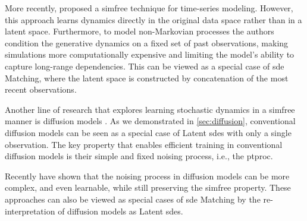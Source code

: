 More recently, \citet{zhang2024trajectory} proposed a \gls{simfree} technique for time-series modeling. However, this approach learns dynamics directly in the original data space rather than in a latent space. Furthermore, to model non-Markovian processes the authors condition the generative dynamics on a fixed set of past observations, making simulations more computationally expensive and limiting the model's ability to capture long-range dependencies. This can be viewed as a special case of \gls{sde} Matching, where the latent space is constructed by concatenation of the most recent observations.


Another line of research that explores learning stochastic dynamics in a \gls{simfree} manner is diffusion models \cite{ho2020denoising, song2021scorebased}. As we demonstrated in \cref{sec:diffusion}, conventional diffusion models can be seen as a special case of Latent \glspl{sde} with only a single observation. The key property that enables efficient training in conventional diffusion models is their simple and fixed noising process, i.e., the \gls{ptproc}.


Recently \citet{singhal2023where,bartosh2023neural, nielsen2024diffenc, sahoo2024diffusion, bartosh2024neural, du2024doob} have shown that the noising process in diffusion models can be more complex, and even learnable, while still preserving the \gls{simfree} property. These approaches can also be viewed as special cases of \gls{sde} Matching by the re-interpretation of diffusion models as Latent \glspl{sde}.